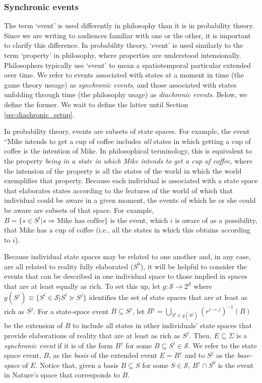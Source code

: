 \documentclass[
11pt,
titlepage,
reqno,
]{article}%
\theoremstyle{definition}
\begin{document}

	\subsubsection{Synchronic events}

	The term `event' is used differently in philosophy than it is in probability theory. 
	Since we are writing to audiences familiar with one or the other, it is important to clarify this difference. 
	In probability theory, `event' is used similarly to the term `property' in philosophy, where properties are understood intensionally. 
	Philosophers typically use `event' to mean a spatiotemporal particular extended over time. 
	We refer to events associated with states at a moment in time (the game theory useage) as \textit{synchronic events}, and those associated with states unfolding through time (the philosophy usage) as \textit{diachronic events}.
	Below, we define the former.
	We wait to define the latter until Section \ref{sec:diachronic_setup}.
	
	In probability theory, events are subsets of state spaces. 
	For example, the event ``Mike intends to get a cup of coffee includes \textit{all} states in which getting a cup of coffee is the intention of Mike. 
	In philosophical terminology, this is equivalent to the property \textit{being in a state in which Mike intends to get a cup of coffee,} where the intension of the property is all the states of the world in which the world exemplifies that property.
	Because each individual is associated with a state space that elaborates states according to the features of the world of which that individual could be aware in a given moment, the events of which he or she could be aware are subsets of that space. 
	For example, $B=\{s\in S^i|s\Rightarrow \text{Mike has coffee}\}$ is the event, which $i$ is aware of as a possibility, that Mike has a cup of coffee (i.e., all the states in which this obtains according to $i$).

	Because individual state spaces may be related to one another and, in any case, are all related to reality fully elaborated ($S^0$), it will be helpful to consider the events that can be described in one individual space to those implied in spaces that are at least equally as rich.
	To set this up, let $g:\mathcal{S}\rightarrow 2^{\mathcal{S}}$ where $g(S^j)\equiv\{S^i\in\mathcal {S}|S^i\succeq S^j\}$ identifies the set of state spaces that are at least as rich as $S^j$.
	For a state-space event $B\subseteq S^j$, let $B^{\uparrow}=\bigcup_{S^i\in g(S^j)}\left(r^{i\rightarrow j}\right)^{-1}(B)$ be the extension of $B$ to include all states in other individuals' state spaces that provide elaborations of reality that are at least as rich as $S^j$.
	Then, $E\subseteq \Sigma$ is a \textit{synchronic event} if it is of the form $B^{\uparrow}$ for some $B\subseteq S^i\in \mathcal{S}$.
	We refer to the state space event, $B$, as the \textit{basis} of the extended event $E=B^{\uparrow}$ and to $S^j$ as the \textit{base-space} of $E$.
	Notice that, given a basis $B\subseteq S$ for some $S\in\mathcal{S}$, $B^\uparrow\cap S^0$ is the event in Nature's space that corresponds to $B$.
	
\end{document}
